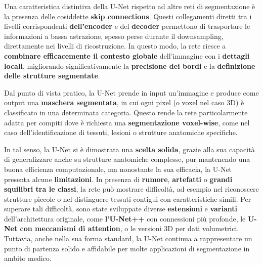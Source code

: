 Una caratteristica distintiva della U-Net rispetto ad altre reti di segmentazione è la presenza delle cosiddette \textbf{skip connections}. Questi collegamenti diretti tra i livelli corrispondenti \textbf{dell’encoder} e del \textbf{decoder} permettono di trasportare le informazioni a bassa astrazione, spesso perse durante il downsampling, direttamente nei livelli di ricostruzione. In questo modo, la rete riesce a \textbf{combinare efficacemente il contesto globale} dell’immagine con i \textbf{dettagli locali}, migliorando significativamente la \textbf{precisione dei bordi} e la \textbf{definizione delle strutture segmentate}.

Dal punto di vista pratico, la U-Net prende in input un’immagine e produce come output una \textbf{maschera segmentata}, in cui ogni pixel (o voxel nel caso 3D) è classificato in una determinata categoria. Questo rende la rete particolarmente adatta per compiti dove è richiesta una \textbf{segmentazione voxel-wise}, come nel caso dell’identificazione di tessuti, lesioni o strutture anatomiche specifiche.


In tal senso, la U-Net si è dimostrata una \textbf{scelta solida}, grazie alla sua capacità di generalizzare anche su strutture anatomiche complesse, pur mantenendo una buona efficienza computazionale, ma nonostante la sua efficacia, la U-Net presenta alcune \textbf{limitazioni}. In presenza di \textbf{rumore}, \textbf{artefatti} o \textbf{grandi squilibri tra le classi}, la rete può mostrare difficoltà, ad esempio nel riconoscere strutture piccole o nel distinguere tessuti contigui con caratteristiche simili. Per superare tali difficoltà, sono state sviluppate diverse \textbf{estensioni} e \textbf{varianti} dell’architettura originale, come \textbf{l’U-Net++} con connessioni più profonde, le \textbf{U-Net con meccanismi di attention}, o le versioni 3D per dati volumetrici. Tuttavia, anche nella sua forma standard, la U-Net continua a rappresentare un punto di partenza solido e affidabile per molte applicazioni di segmentazione in ambito medico.




